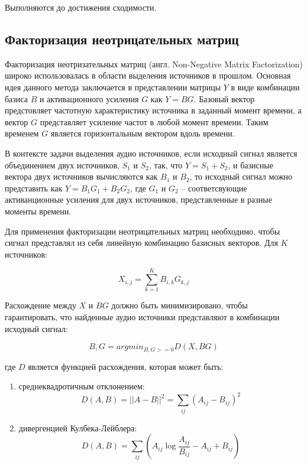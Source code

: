 Выполняются до достижения сходимости.

\subsection{Факторизация неотрицательных матриц}

Факторизация неотризательных матриц (англ. Non-Negative Matrix Factorization) широко использовалась в области выделения источников в прошлом. Основная идея данного метода заключается в представлении матрицы $Y$ в виде комбинации базиса $B$ и активационного усиления $G$ как $Y=BG$. Базовый вектор предстовляет частотную характеристику источника в заданный момент времени, а вектор $G$ представляет усиление частот в любой момент времени. Таким временем $G$ является горизонтальным вектором вдоль времени.

В контексте задачи выделения аудио источников, если исходный сигнал является объединением двух источников, $S_1$ и $S_2$, так, что $Y = S_1 + S_2$, и базисные вектора двух источников вычисляются как $B_1$ и $B_2$, то исходный сигнал можно представить как $Y = B_1 G_1 + B_2 G_2$, где $G_1$ и $G_2$ -- соответсвующие активанционные усиления для двух источников, представленные в разные моменты времени. 

Для применения факторизации неотрицательных матриц необходимо, чтобы сигнал представлял из себя линейную комбинацию базисных векторов. Для $K$ источников:

\begin{equation}
X_{i,j} = \sum_{k=1}^{K} B_{i,k} G_{k, j}
\end{equation}

Расхождение между $X$ и $BG$ должно быть минимизировано, чтобы гарантировать, что найденные аудио источники представляют в комбинации исходный сигнал:

\begin{equation}
{B, G} = argmin_{B, G >= 0} D (X, BG)
\end{equation}

где $D$ является функцией расхождения, которая может быть:

\begin{enumerate}
	\item среднеквадротичным отклонением:
	\begin{equation}
	D (A, B) = ||A-B||^2 = \sum_{ij}(A_{ij} - B_{ij})^2
	\label{anal:mse}
	\end{equation}
	\item дивергенцией Кулбека-Лейблера:
	\begin{equation}
		D (A, B) = \sum_{ij} (A_{ij} \log\frac{A_{ij}}{B_{ij}} - A_{ij} + B_{ij})
		\label{anal:kl}
	\end{equation}
\end{enumerate}

